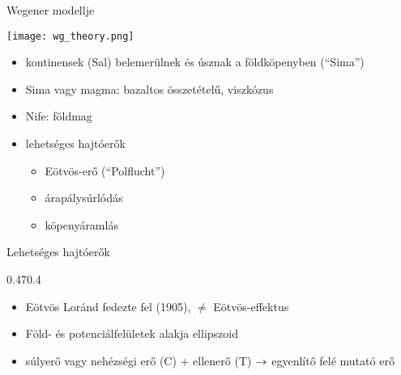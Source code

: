 \begin{frame}{Wegener modellje}
    \begin{center}
        \texttt{[image: wg\_theory.png]}
    \end{center}

    \begin{minipage}[c]{0.45\textwidth}
        \begin{itemize}
            \item kontinensek (Sal) belemerülnek és úsznak a földköpenyben (``Sima'')
            \item Sima vagy magma: bazaltos összetételű, viszkózus
            \item Nife: földmag
        \end{itemize}
    \end{minipage}
    \begin{minipage}[c]{0.45\textwidth}
    \begin{itemize}
        \item lehetséges hajtóerők
        \begin{itemize}
            \item Eötvös-erő (``Polflucht'')
            \item árapálysúrlódás
            \item köpenyáramlás
        \end{itemize}
    \end{itemize}
    \end{minipage}
\end{frame}


\begin{frame}{Lehetséges hajtóerők}
    \begin{figp}{}{}{0.47}{0.4}
        \begin{itemize}
            \item Eötvös Loránd fedezte fel (1905), $\ne$ Eötvös-effektus
            \item Föld- és potenciálfelületek alakja ellipszoid
            \item súlyerő vagy nehézségi erő (C) + ellenerő (T) $\rightarrow$ egyenlítő felé mutató erő
        \end{itemize}
    \end{figp}
\end{frame}


